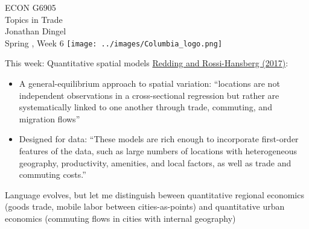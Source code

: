 \documentclass[11pt,notes=hide,aspectratio=169]{beamer}
\begin{document}
\begin{frame}[plain]
\begin{center}
\large
\textcolor{columbiadarkblue}{ECON G6905\\
Topics in Trade\\ 
Jonathan Dingel\\
Spring \the\year, Week 6}
\vfill 
\texttt{[image: ../images/Columbia\_logo.png]}
\end{center}
\end{frame}
\begin{frame}{This week: Quantitative spatial models}
\href{https://doi.org/10.1146/annurev-economics-063016-103713}{Redding and Rossi-Hansberg (2017)}:
\begin{itemize}
\item A general-equilibrium approach to spatial variation:
``locations are not independent observations in a cross-sectional regression but rather are systematically linked to one another through trade, commuting, and migration flows''
\item Designed for data: 
``These models are rich enough to incorporate first-order features of the data, such as large numbers of locations with heterogeneous geography, productivity, amenities, and local factors, as well as trade and commuting costs.''
\end{itemize}
Language evolves, but let me distinguish beween
quantitative regional economics (goods trade, mobile labor between cities-as-points)
and
quantitative urban economics (commuting flows in cities with internal geography)
\end{frame}
\end{document}
